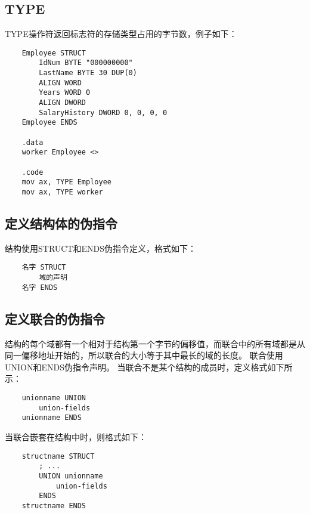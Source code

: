 \documentclass[a4paper,left=2.5cm,right=2.5cm,11pt]{article}
\begin{document}
\subsection{TYPE}
	TYPE操作符返回标志符的存储类型占用的字节数，例子如下：
	\begin{lstlisting}
	Employee STRUCT
		IdNum BYTE "000000000"
		LastName BYTE 30 DUP(0)
		ALIGN WORD
		Years WORD 0
		ALIGN DWORD
		SalaryHistory DWORD 0, 0, 0, 0
	Employee ENDS

	.data
	worker Employee <>

	.code
	mov ax, TYPE Employee
	mov ax, TYPE worker
	\end{lstlisting}

\subsection{定义结构体的伪指令}
	结构使用STRUCT和ENDS伪指令定义，格式如下：
	\begin{lstlisting}
	名字 STRUCT
		域的声明
	名字 ENDS
	\end{lstlisting}

\subsection{定义联合的伪指令}
	结构的每个域都有一个相对于结构第一个字节的偏移值，而联合中的所有域都是从同一偏移地址开始的，所以联合的大小等于其中最长的域的长度。
	联合使用UNION和ENDS伪指令声明。
	当联合不是某个结构的成员时，定义格式如下所示：
	\begin{lstlisting}
	unionname UNION
		union-fields
	unionname ENDS
	\end{lstlisting}

	当联合嵌套在结构中时，则格式如下：
	\begin{lstlisting}
	structname STRUCT
		; ...
		UNION unionname
			union-fields
		ENDS
	structname ENDS
	\end{lstlisting}
\end{document}
